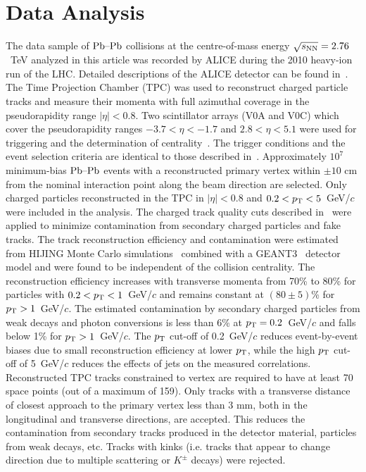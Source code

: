 \section{Data Analysis}
\label{sec:experiment}
The data sample of $\textnormal{Pb--Pb}$ collisions at the centre-of-mass energy $\sqrt{s_{\textnormal{NN}}}=2.76$~TeV analyzed in this article was recorded by ALICE during the 2010 heavy-ion run of the LHC.
Detailed descriptions of the ALICE detector can be found
in~\cite{Aamodt:2008zz,Carminati:2004fp,Alessandro:2006yt}. The Time
Projection Chamber (TPC) was used to reconstruct charged particle
tracks and measure their momenta with full azimuthal coverage in the
pseudorapidity range $|\eta|<0.8$. Two scintillator
arrays (V0A and V0C) which cover the pseudorapidity  ranges $-3.7<\eta<-1.7$
and $2.8<\eta<5.1$ were used for triggering and the determination of
centrality~\cite{Aamodt:2010cz}. The trigger
conditions and the event selection criteria are identical to those
described in~\cite{Aamodt:2010pa, Aamodt:2010cz}.
Approximately $10^7$ minimum-bias $\textnormal{Pb--Pb}$ events with
a reconstructed primary vertex within $\pm 10$ cm from the nominal
interaction point along the beam direction are selected. Only charged particles reconstructed in the TPC in $|\eta|<0.8$
and $0.2<p_{\rm T}<5$~GeV/$c$ were included in the analysis. The charged track quality cuts
described in~\cite{Aamodt:2010pa} were applied to minimize
contamination from secondary charged particles and fake tracks.
The track reconstruction efficiency and contamination
were estimated from HIJING Monte Carlo
simulations~\cite{Wang:1991hta} combined with a GEANT3~\cite{Brun:1994aa} detector model and were found to be independent of
the collision centrality. The reconstruction efficiency increases with transverse momenta from
70\% to 80\% for particles with $0.2<p_{\rm T}<1$~GeV/$c$ and remains
constant at $(80 \pm 5)$\% for $p_{\rm T}>1$~GeV/$c$. The estimated
contamination by secondary charged particles from weak decays and
photon conversions is less than 6\% at $p_{\rm T}=0.2$~GeV/$c$ and falls
below 1\% for $p_{\rm T}>1$~GeV/$c$.
The $p_{\rm T}$ cut-off of 0.2~GeV/$c$ reduces event-by-event biases due to small reconstruction efficiency 
at lower $p_{\rm T}$, while the high $p_{\rm T}$ cut-off of 5~GeV/$c$ reduces the effects of jets on the measured correlations. 
Reconstructed TPC tracks constrained to vertex are required to have at least 70 space points (out of a maximum of 159). 
Only tracks with a transverse distance of closest approach to the primary vertex less than 3 mm, both in the longitudinal and transverse directions, are accepted. This reduces the contamination from secondary tracks produced in the detector material, particles from weak decays, etc. Tracks with kinks (i.e. tracks that appear to change direction due to multiple scattering or $K^{\pm}$ decays) were rejected.


